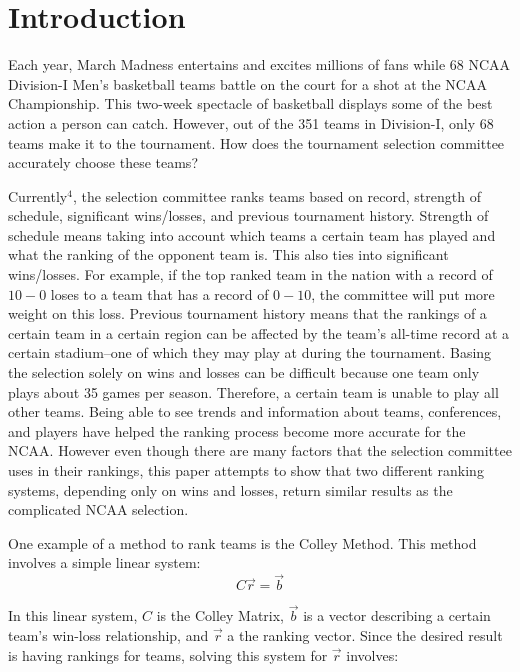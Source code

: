 \documentclass[12pt]{article}
\begin{document}
\newpage
{} %
\section{Introduction}
\label{sec:intro} %
Each year, March Madness entertains and excites millions of fans while 68 NCAA Division-I Men's basketball teams battle on the court for a shot at the NCAA Championship. This two-week spectacle of basketball displays some of the best action a person can catch. However, out of the 351 teams in Division-I, only 68 teams make it to the tournament. How does the tournament selection committee accurately choose these teams?

Currently$^4$, the selection committee ranks teams based on record, strength of schedule, significant wins/losses, and previous tournament history. Strength of schedule means taking into account which teams a certain team has played and what the ranking of the opponent team is. This also ties into significant wins/losses. For example, if the top ranked team in the nation with a record of $10-0$ loses to a team that has a record of $0-10$, the committee will put more weight on this loss.
Previous tournament history means that the rankings of a certain team in a certain region can be affected by the team's all-time record at a certain stadium--one of which they may play at during the tournament. Basing the selection solely on wins and losses can be difficult because one team only plays about 35 games per season. Therefore, a certain team is unable to play all other teams. Being able to see trends and information about teams, conferences, and players have helped the ranking process become more accurate for the NCAA. However even though there are many factors that the selection committee uses in their rankings, this paper attempts to show that two different ranking systems, depending only on wins and losses, return similar results as the complicated NCAA selection.

One example of a method to rank teams is the Colley Method. This method involves a simple linear system:
\begin{equation}
C \vec{r} = \vec{b}
\end{equation}


In this linear system, $C$ is the Colley Matrix, $\vec{b}$ is a vector describing a certain team's win-loss relationship, and $\vec{r}$ a the ranking vector. Since the desired result is having rankings for teams, solving this system for $\vec{r}$ involves:
\end{document}

